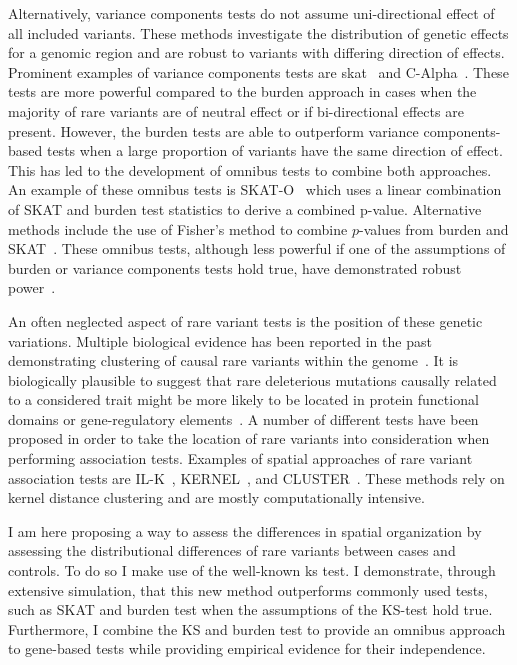 Alternatively, variance components tests do not assume uni-directional effect of all included variants. 
These methods investigate the distribution of genetic effects for a genomic region and are robust to variants with differing direction of effects.
Prominent examples of variance components tests are \acrfull{skat}~\cite{Wu2011} and C-Alpha~\cite{Neale2011}.
These tests are more powerful compared to the burden approach in cases when the majority of rare variants are of neutral effect or if bi-directional effects are present.
However, the burden tests are able to outperform variance components-based tests when a large proportion of variants have the same direction of effect.
This has led to the development of omnibus tests to combine both approaches.
An example of these omnibus tests is SKAT-O~\cite{Lee2012a} which uses a linear combination of SKAT and burden test statistics to derive a combined p-value.
Alternative methods include the use of Fisher's method to combine $p$-values from burden and SKAT~\cite{Derkach2013a}.
These omnibus tests, although less powerful if one of the assumptions of burden or variance components tests hold true, have demonstrated robust power~\cite{Lee2014}. 

An often neglected aspect of rare variant tests is the position of these genetic variations.
Multiple biological evidence has been reported in the past demonstrating clustering of causal rare variants within the genome~\cite{Ionita-Laza2012, Raab2010,Schaid2013,Fier2012}.
It is biologically plausible to suggest that rare deleterious mutations causally related to a considered trait might be more likely to be located in protein functional domains or gene-regulatory elements~\cite{Fier2012}.
A number of different tests have been proposed in order to take the location of rare variants into consideration when performing association tests.
Examples of spatial approaches of rare variant association tests are IL-K~\cite{Ionita-Laza2012}, KERNEL~\cite{Schaid2013}, and CLUSTER~\cite{Lin2014}.
These methods rely on kernel distance clustering and are mostly computationally intensive.

I am here proposing a way to assess the differences in spatial organization by assessing the distributional differences of rare variants between cases and controls.
To do so I make use of the well-known \acrfull{ks} test.
I demonstrate, through extensive simulation, that this new method outperforms commonly used tests, such as SKAT and burden test when the assumptions of the KS-test hold true.
Furthermore, I combine the KS and burden test to provide an omnibus approach to gene-based tests while providing empirical evidence for their independence.
